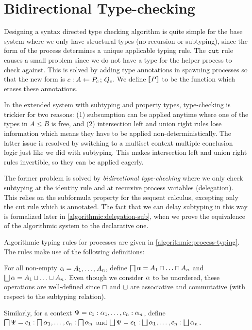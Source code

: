 
\section{Bidirectional Type-checking}

Designing a syntax directed type checking algorithm is quite simple for the base system where we only have structural types (no recursion or subtyping), since the form of the process determines a unique applicable typing rule. The $\cut$ rule causes a small problem since we do not have a type for the helper process to check against. This is solved by adding type annotations in spawning processes so that the new form is $\tspawnType c {P_c} A {Q_c}$. We define $\erase{P}$ to be the function which erases these annotations.

In the extended system with subtyping and property types, type-checking is trickier for two reasons: (1) subsumption can be applied anytime where one of the types in $A \le B$ is free, and (2) intersection left and union right rules lose information which means they have to be applied non-deterministically. The latter issue is resolved by switching to a multiset context multiple conclusion logic just like we did with subtyping. This makes intersection left and union right rules invertible, so they can be applied eagerly.

The former problem is solved by \emph{bidirectional type-checking} where we only check subtyping at the identity rule and at recursive process variables (delegation). This relies on the subformula property for the sequent calculus, excepting only the cut rule which is annotated. The fact that we can delay subtyping in this way is formalized later in \cref{algorithmic:delegation-sub}, when we prove the equivalence of the algorithmic system to the declarative one.

Algorithmic typing rules for processes are given in \cref{algorithmic:process-typing}. The rules make use of the following definitions:

\begin{definition}
  For all non-empty $\typeList = A_1, \ldots, A_n$, define $\all \typeList = A_1 \intersect \ldots \intersect A_n$ and $\any \typeList = A_1 \union \ldots \union A_n$. Even though we consider $\typeList$ to be unordered, these operations are well-defined since $\intersect$ and $\union$ are associative and commutative (with respect to the subtyping relation).

  Similarly, for a context $\ctx = c_1 : \typeList_1, \ldots, c_n : \typeList_n$, define $\all \ctx = c_1 : \all {\typeList_1}, \ldots, c_n : \all {\typeList_n}$ and $\any \ctx = c_1 : \any {\typeList_1}, \ldots, c_n : \any {\typeList_n}$.
\end{definition}

